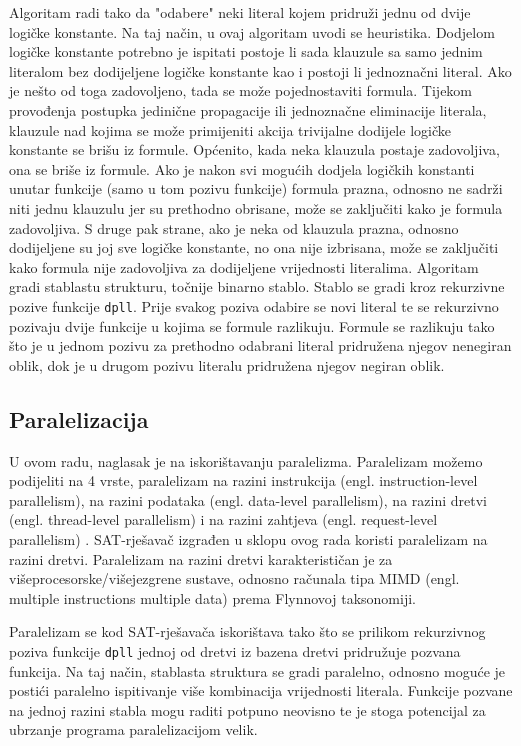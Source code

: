 \documentclass[hidelinks, conference]{IEEEtran}
\begin{document}
Algoritam radi tako da "odabere" neki literal kojem pridruži jednu od dvije logičke konstante. Na taj način, u ovaj algoritam uvodi se heuristika. Dodjelom logičke konstante potrebno je ispitati postoje li sada klauzule sa samo jednim literalom bez dodijeljene logičke konstante kao i postoji li jednoznačni literal. Ako je nešto od toga zadovoljeno, tada se može pojednostaviti formula. Tijekom provođenja postupka jedinične propagacije ili jednoznačne eliminacije literala, klauzule nad kojima se može primijeniti akcija trivijalne dodijele logičke konstante se brišu iz formule. Općenito, kada neka klauzula postaje zadovoljiva, ona se briše iz formule. Ako je nakon svi mogućih dodjela logičkih konstanti unutar funkcije (samo u tom pozivu funkcije) formula prazna, odnosno ne sadrži niti jednu klauzulu jer su prethodno obrisane, može se zaključiti kako je formula zadovoljiva. S druge pak strane, ako je neka od klauzula prazna, odnosno dodijeljene su joj sve logičke konstante, no ona nije izbrisana, može se zaključiti kako formula nije zadovoljiva za dodijeljene vrijednosti literalima. Algoritam gradi stablastu strukturu, točnije binarno stablo. Stablo se gradi kroz rekurzivne pozive funkcije \texttt{dpll}. Prije svakog poziva odabire se novi literal te se rekurzivno pozivaju dvije funkcije u kojima se formule razlikuju. Formule se razlikuju tako što je u jednom pozivu za prethodno odabrani literal pridružena njegov nenegiran oblik, dok je u drugom pozivu literalu pridružena njegov negiran oblik.

\subsection{Paralelizacija}
U ovom radu, naglasak je na iskorištavanju paralelizma. Paralelizam možemo podijeliti na 4 vrste, paralelizam na razini instrukcija (engl. instruction-level parallelism), na razini podataka (engl. data-level parallelism), na razini dretvi (engl. thread-level parallelism) i na razini zahtjeva (engl. request-level parallelism) \cite{b3}. SAT-rješavač izgrađen u sklopu ovog rada koristi paralelizam na razini dretvi. Paralelizam na razini dretvi karakterističan je za višeprocesorske/višejezgrene sustave, odnosno računala tipa MIMD (engl. multiple instructions multiple data) prema Flynnovoj taksonomiji.

Paralelizam se kod SAT-rješavača iskorištava tako što se prilikom rekurzivnog poziva funkcije \texttt{dpll} jednoj od dretvi iz bazena dretvi pridružuje pozvana funkcija. Na taj način, stablasta struktura se gradi paralelno, odnosno moguće je postići paralelno ispitivanje više kombinacija vrijednosti literala. Funkcije pozvane na jednoj razini stabla mogu raditi potpuno neovisno te je stoga potencijal za ubrzanje programa paralelizacijom velik.
\end{document}
